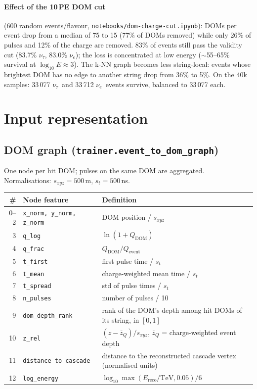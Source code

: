 \documentclass[11pt,a4paper]{article}
\newcommand{\nutau}{\ensuremath{\nu_\tau}}
\newcommand{\nue}{\ensuremath{\nu_e}}
\newcommand{\code}[1]{\texttt{#1}}
\begin{document}
\paragraph{Effect of the 10\,PE DOM cut} (600 random events/flavour, \code{notebooks/dom-charge-cut.ipynb}):
DOMs per event drop from a median of 75 to 15 (77\% of DOMs removed) while only 26\% of pulses and 12\% of the
charge are removed. 83\% of events still pass the validity cut (83.7\% \nutau, 83.0\% \nue); the loss is concentrated
at low energy ($\sim$55--65\% survival at $\log_{10}E\approx3$). The k-NN graph becomes less string-local: events whose
brightest DOM has no edge to another string drop from 36\% to 5\%. On the 40k samples: 33\,077 \nutau\ and 33\,712
\nue\ events survive, balanced to 33\,077 each.

\section{Input representation}
\subsection{DOM graph (\code{trainer.event\_to\_dom\_graph})}
One node per hit DOM; pulses on the same DOM are aggregated. Normalisations: $s_{xyz}=500$\,m, $s_t=500$\,ns.

\begin{tabularx}{\textwidth}{rlY}
\toprule
\# & Node feature & Definition\\
--2 & \code{x\_norm, y\_norm, z\_norm} & DOM position / $s_{xyz}$\\
3 & \code{q\_log} & $\ln(1+Q_\mathrm{DOM})$\\
4 & \code{q\_frac} & $Q_\mathrm{DOM}/Q_\mathrm{event}$\\
5 & \code{t\_first} & first pulse time / $s_t$\\
6 & \code{t\_mean} & charge-weighted mean time / $s_t$\\
7 & \code{t\_spread} & std of pulse times / $s_t$\\
8 & \code{n\_pulses} & number of pulses / 10\\
9 & \code{dom\_depth\_rank} & rank of the DOM's depth among hit DOMs of its string, in $[0,1]$\\
10 & \code{z\_rel} & $(z-\bar z_Q)/s_{xyz}$, $\bar z_Q$ = charge-weighted event depth\\
11 & \code{distance\_to\_cascade} & distance to the reconstructed cascade vertex (normalised units)\\
12 & \code{log\_energy} & $\log_{10}\max(E_\mathrm{reco}/\mathrm{TeV},0.05)/6$\\
\bottomrule
\end{tabularx}
\end{document}
